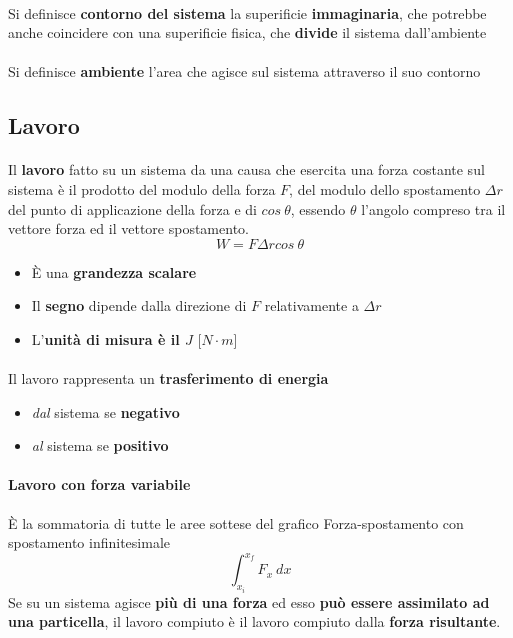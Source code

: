 \documentclass[12pt]{article}
\begin{document}
    \paragraph{} Si definisce \textbf{contorno del sistema} la superificie \textbf{immaginaria}, che potrebbe anche coincidere con una superificie fisica, che \textbf{divide} il sistema dall'ambiente
    \paragraph{} Si definisce \textbf{ambiente} l'area che agisce sul sistema attraverso il suo contorno
    \newpage
    \subsection{Lavoro}
    \paragraph{} Il \textbf{lavoro} fatto su un sistema da una causa che esercita una forza costante sul sistema è il prodotto del modulo della forza $F$, del modulo dello spostamento $\Delta r$ del punto di applicazione della forza e di $cos \ \theta$, essendo $\theta$ l'angolo compreso tra il vettore forza ed il vettore spostamento.
    $$ W = F \Delta r cos \ \theta$$
    \begin{itemize}
        \item È una \textbf{grandezza scalare}
        \item Il \textbf{segno} dipende dalla direzione di $F$ relativamente a $\Delta r$
        \item L'\textbf{unità di misura è il $J$} [$N \cdot m$]
    \end{itemize}
    \paragraph{} Il lavoro rappresenta un \textbf{trasferimento di energia}
    \begin{itemize}
        \item \textit{dal} sistema se \textbf{negativo}
        \item \textit{al} sistema se \textbf{positivo}
    \end{itemize}
    \paragraph{Lavoro con forza variabile} È la sommatoria di tutte le aree sottese del grafico Forza-spostamento con spostamento infinitesimale
    $$\int_{x_i}^{x_f} F_x \ dx$$
    Se su un sistema agisce \textbf{più di una forza} ed esso \textbf{può essere assimilato ad una particella}, il lavoro compiuto è il lavoro compiuto dalla \textbf{forza risultante}.
\newpage
\end{document}
